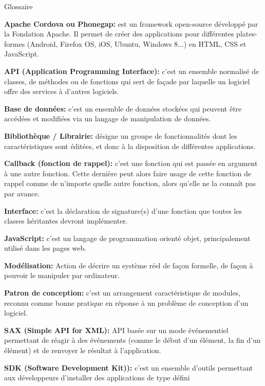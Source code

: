 {\Huge{Glossaire}}

\vspace{2cm}

{\bfseries Apache Cordova ou Phonegap:} est un framework open-source développé par la Fondation Apache. Il permet de créer des applications pour différentes plates-formes (Android, Firefox OS, iOS, Ubuntu, Windows 8...) en HTML, CSS et JavaScript.
\bigskip

{\bfseries API (Application Programming Interface):} c'est un ensemble normalisé de classes, de méthodes ou de fonctions qui sert de façade par laquelle un logiciel offre des services à d'autres logiciels.
\bigskip

{\bfseries Base de données:} c’est un ensemble de données stockées qui peuvent être accédées et modifiées via un langage de manipulation de données.
\bigskip

{\bfseries Bibliothèque / Librairie:} désigne un groupe de fonctionnalités dont les caractéristiques sont éditées, et donc à la disposition de différentes applications.
\bigskip

{\bfseries Callback (fonction de rappel):} c'est une fonction qui est passée en argument à une autre fonction. Cette dernière peut alors faire usage de cette fonction de rappel comme de n'importe quelle autre fonction, alors qu'elle ne la connaît pas par avance.
\bigskip

{\bfseries Interface:} c’est la déclaration de signature(s) d'une fonction que toutes les classes héritantes devront implémenter.
\bigskip

{\bfseries JavaScript:} c’est un langage de programmation orienté objet, principalement utilisé dans les pages web.
\bigskip

{\bfseries Modélisation:} Action de décrire un système réel de façon formelle, de façon à pouvoir le manipuler par ordinateur.
\bigskip

{\bfseries Patron de conception:} c'est un arrangement caractéristique de modules, reconnu comme bonne pratique en réponse à un problème de conception d'un logiciel.
\bigskip

{\bfseries SAX (Simple API for XML):} API basée sur un mode événementiel permettant de réagir à des événements (comme le début d'un élément, la fin d'un élément) et de renvoyer le résultat à l'application.
\bigskip

{\bfseries SDK (Software Development Kit)):} c'est un ensemble d'outils permettant aux développeurs d'installer des applications de type défini
\bigskip

 